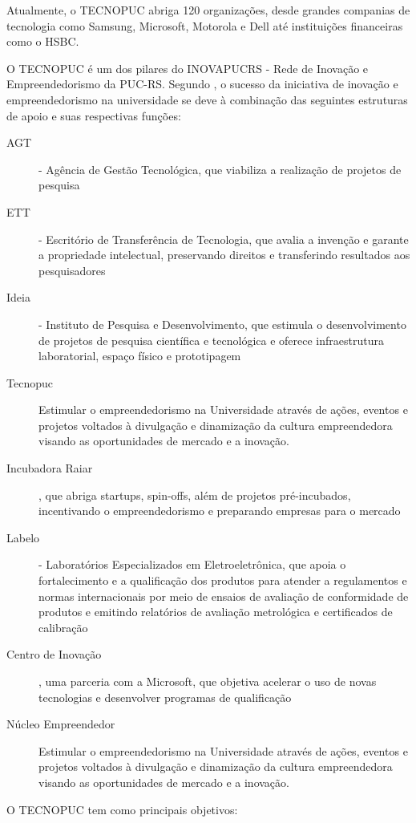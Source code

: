 Atualmente, o TECNOPUC abriga 120 organizações, desde grandes companias de tecnologia como Samsung, Microsoft, Motorola e Dell até instituições financeiras como o HSBC. 

O TECNOPUC é um dos pilares do INOVAPUCRS - Rede de Inovação e Empreendedorismo da PUC-RS. Segundo , o sucesso da iniciativa de inovação e empreendedorismo na universidade se deve à combinação das seguintes estruturas de apoio e suas respectivas funções:

\begin{description}
\item[AGT] - Agência de Gestão Tecnológica, que viabiliza a realização de projetos de pesquisa
\item[ETT] - Escritório de Transferência de Tecnologia, que avalia a invenção e garante a propriedade intelectual, preservando direitos e transferindo resultados aos pesquisadores
\item[Ideia] - Instituto de Pesquisa e Desenvolvimento, que estimula o desenvolvimento de projetos de pesquisa científica e tecnológica e oferece infraestrutura laboratorial, espaço físico e prototipagem
\item[Tecnopuc] Estimular o empreendedorismo na Universidade através de ações, eventos e projetos voltados à divulgação e dinamização da cultura empreendedora visando as oportunidades de mercado e a inovação.
\item[Incubadora Raiar], que abriga startups, spin-offs, além de projetos pré-incubados, incentivando o empreendedorismo e preparando empresas para o mercado
\item[Labelo] - Laboratórios Especializados em Eletroeletrônica, que apoia o fortalecimento e a qualificação dos produtos para atender a regulamentos e normas internacionais por meio de ensaios de avaliação de conformidade de produtos e emitindo relatórios de avaliação metrológica e certificados de calibração
\item[Centro de Inovação], uma parceria com a Microsoft, que objetiva acelerar o uso de novas tecnologias e desenvolver programas de qualificação
\item[Núcleo Empreendedor] Estimular o empreendedorismo na Universidade através de ações, eventos e projetos voltados à divulgação e dinamização da cultura empreendedora visando as oportunidades de mercado e a inovação.
\end{description}

O TECNOPUC tem como principais objetivos:


